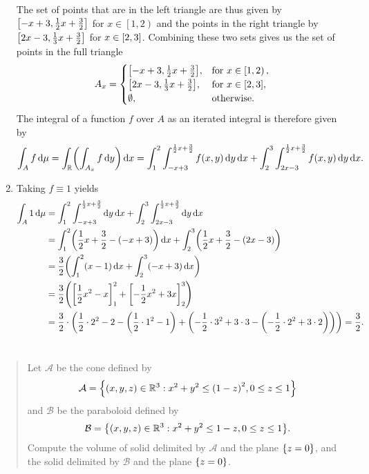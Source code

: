 \documentclass{exercise}
\begin{document}
\begin{enumerate}
		The set of points that are in the left triangle are thus given by \(\brackets*{-x + 3, \frac{1}{2}x + \frac{3}{2}}\) for \(x \in \left[1, 2\right)\) and the points in the right triangle by \(\brackets*{2x - 3, \frac{1}{3}x + \frac{3}{2}}\) for \(x \in \brackets*{2, 3}\).
		Combining these two sets gives us the set of points in the full triangle
		\[
			A_x = \begin{cases}
				\brackets*{-x + 3, \frac{1}{2}x + \frac{3}{2}}, & \text{for }x \in \left[1, 2\right),\\
				\brackets*{2x - 3, \frac{1}{3}x + \frac{3}{2}}, & \text{for }x \in \brackets*{2, 3},\\
				\emptyset, & \text{otherwise}.
			\end{cases}
		\]
		The integral of a function \(f\) over \(A\) as an iterated integral is therefore given by
		\[
			\int_A f\d\mu = \int_\R \parentheses*{\int_{A_x}f\d y}\d x = \int_1^2 \int_{-x + 3}^{\frac{1}{2}x + \frac{3}{2}}f\parentheses*{x, y}\d y\d x + \int_2^3 \int_{2x - 3}^{\frac{1}{2}x + \frac{3}{2}}f\parentheses*{x, y}\d y\d x.
		\]
		\item Taking \(f \equiv 1\) yields
		\begin{align*}
			\int_A 1\d\mu &= \int_1^2 \int_{-x + 3}^{\frac{1}{2}x + \frac{3}{2}}\d y\d x + \int_2^3 \int_{2x - 3}^{\frac{1}{2}x + \frac{3}{2}}\d y\d x\\
			&= \int_1^2 \parentheses*{\frac{1}{2}x + \frac{3}{2} - \parentheses*{-x + 3}}\d x + \int_2^3 \parentheses*{\frac{1}{2}x + \frac{3}{2} - \parentheses*{2x - 3}}\\
			&= \frac{3}{2}\parentheses*{\int_1^2 \parentheses*{x - 1}\d x + \int_2^3 \parentheses*{-x + 3}\d x}\\
			&= \frac{3}{2}\parentheses*{\brackets*{\frac{1}{2}x^2 - x}_1^2 + \brackets*{-\frac{1}{2}x^2 + 3x}_2^3}\\
			&= \frac{3}{2} \cdot \parentheses*{\frac{1}{2} \cdot 2^2 - 2 - \parentheses*{\frac{1}{2} \cdot 1^2 - 1} + \parentheses*{-\frac{1}{2} \cdot 3^2 + 3 \cdot 3 - \parentheses*{-\frac{1}{2} \cdot 2^2 + 3 \cdot 2}}} = \frac{3}{2}.
		\end{align*}
	\end{enumerate}


	\section{}

	\begin{quote}
		Let \(\mathcal{A}\) be the cone defined by
		\[
			\mathcal{A} = \braces*{\parentheses*{x, y, z} \in \R^3 : x^2 + y^2 \le \parentheses*{1 - z}^2, 0 \le z \le 1}
		\]
		and \(\mathcal{B}\) be the paraboloid defined by
		\[
			\mathcal{B} = \braces*{\parentheses*{x, y, z} \in \R^3 : x^2 + y^2 \le 1 - z, 0 \le z \le 1}.
		\]
		Compute the volume of solid delimited by \(\mathcal{A}\) and the plane \(\braces*{z = 0}\), and the solid delimited by \(\mathcal{B}\) and the plane \(\braces*{z = 0}\).
	\end{quote}
\end{document}
